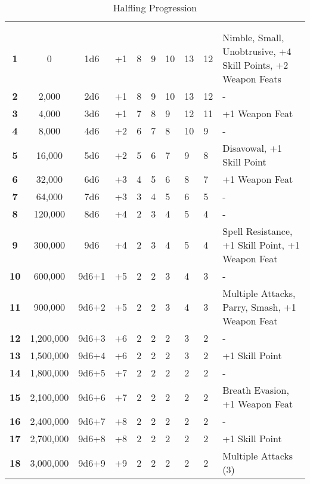 \begin {table}[H]
  \caption{Halfling Progression}
	\begin{tabularx}{\columnwidth}{>{\bfseries}cccM{.31in}M{.51in}M{.25in}M{.43in}M{.32in}M{.45in}Y}
    \thead{}&\thead{}&\thead{}&\thead{}&\thead{}&\setcounter{rownum}{0}\\
     &  &  &  &  &  &  &  &  & \\
		1 & 0 & 1d6 & +1 & 8 & 9 & 10 & 13 & 12 & Nimble, Small, Unobtrusive, +4 Skill Points, +2 Weapon Feats\\
		2 & 2,000 & 2d6 & +1 & 8 & 9 & 10 & 13 & 12 & -\\
		3 & 4,000 & 3d6 & +1 & 7 & 8 & 9 & 12 & 11 & +1 Weapon Feat\\
		4 & 8,000 & 4d6 & +2 & 6 & 7 & 8 & 10 & 9 & -\\
		5 & 16,000 & 5d6 & +2 & 5 & 6 & 7 & 9 & 8 & Disavowal, +1 Skill Point\\
		6 & 32,000 & 6d6 & +3 & 4 & 5 & 6 & 8 & 7 & +1 Weapon Feat\\
		7 & 64,000 & 7d6 & +3 & 3 & 4 & 5 & 6 & 5 & -\\
		8 & 120,000 & 8d6 & +4 & 2 & 3 & 4 & 5 & 4 & -\\
		9 & 300,000 & 9d6 & +4 & 2 & 3 & 4 & 5 & 4 & Spell Resistance, +1 Skill Point, +1 Weapon Feat\\
		10 & 600,000 & 9d6+1 & +5 & 2 & 2 & 3 & 4 & 3 & -\\
		11 & 900,000 & 9d6+2 & +5 & 2 & 2 & 3 & 4 & 3 & Multiple Attacks, Parry, Smash, +1 Weapon Feat\\
		12 & 1,200,000 & 9d6+3 & +6 & 2 & 2 & 2 & 3 & 2 & -\\
		13 & 1,500,000 & 9d6+4 & +6 & 2 & 2 & 2 & 3 & 2 & +1 Skill Point\\
		14 & 1,800,000 & 9d6+5 & +7 & 2 & 2 & 2 & 2 & 2 & -\\
		15 & 2,100,000 & 9d6+6 & +7 & 2 & 2 & 2 & 2 & 2 & Breath Evasion, +1 Weapon Feat\\
		16 & 2,400,000 & 9d6+7 & +8 & 2 & 2 & 2 & 2 & 2 & -\\
		17 & 2,700,000 & 9d6+8 & +8 & 2 & 2 & 2 & 2 & 2 & +1 Skill Point\\
		18 & 3,000,000 & 9d6+9 & +9 & 2 & 2 & 2 & 2 & 2 & Multiple Attacks (3)\\

\end{tabularx}
\end{table}
